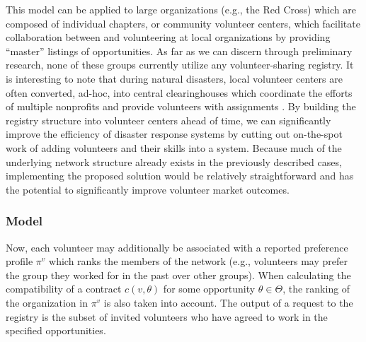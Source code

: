 \documentclass[11pt, margin=1in]{article}
\begin{document}
This model can be applied to large organizations (e.g., the Red Cross) which are composed of individual chapters, or community volunteer centers, which facilitate collaboration between and volunteering at local organizations by providing ``master'' listings of opportunities. As far as we can discern through preliminary research, none of these groups currently utilize any volunteer-sharing registry. It is interesting to note that during natural disasters, local volunteer centers are often converted, ad-hoc, into central clearinghouses which coordinate the efforts of multiple nonprofits and provide volunteers with assignments \cite{managing-volunteers}. By building the registry structure into volunteer centers ahead of time, we can significantly improve the efficiency of disaster response systems by cutting out on-the-spot work of adding volunteers and their skills into a system. Because much of the underlying network structure already exists in the previously described cases, implementing the proposed solution would be relatively straightforward and has the potential to significantly improve volunteer market outcomes. 

\subsubsection{Model}
Now, each volunteer may additionally be associated with a reported preference profile $\pi^v$ which ranks the members of the network (e.g., volunteers may prefer the group they worked for in the past over other groups). When calculating the compatibility of a contract $c(v, \theta)$ for some opportunity $\theta \in \Theta$, the ranking of the organization in $\pi^v$ is also taken into account. The output of a request to the registry is the subset of invited volunteers who have agreed to work in the specified opportunities. 
\end{document}
